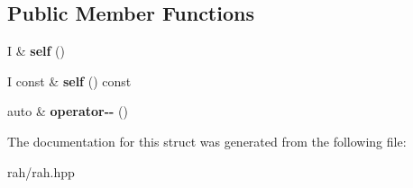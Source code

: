 \subsection*{Public Member Functions}
\begin{DoxyCompactItemize}
\item 
\mbox{\label{struct_r_a_h___n_a_m_e_s_p_a_c_e_1_1iterator__facade_3_01_i_00_01_r_00_01std_1_1bidirectional__iterator__tag_01_4_a7e6b48a568ae8085b523e5d0fe82e57e}} 
I \& {\bfseries self} ()
\item 
\mbox{\label{struct_r_a_h___n_a_m_e_s_p_a_c_e_1_1iterator__facade_3_01_i_00_01_r_00_01std_1_1bidirectional__iterator__tag_01_4_a48a8492fca7c439acc3030cf9b0099bc}} 
I const  \& {\bfseries self} () const
\item 
\mbox{\label{struct_r_a_h___n_a_m_e_s_p_a_c_e_1_1iterator__facade_3_01_i_00_01_r_00_01std_1_1bidirectional__iterator__tag_01_4_a8fcb087058db01ea12845a74fd2006f1}} 
auto \& {\bfseries operator-\/-\/} ()
\end{DoxyCompactItemize}


The documentation for this struct was generated from the following file\+:\begin{DoxyCompactItemize}
\item 
rah/rah.\+hpp\end{DoxyCompactItemize}
